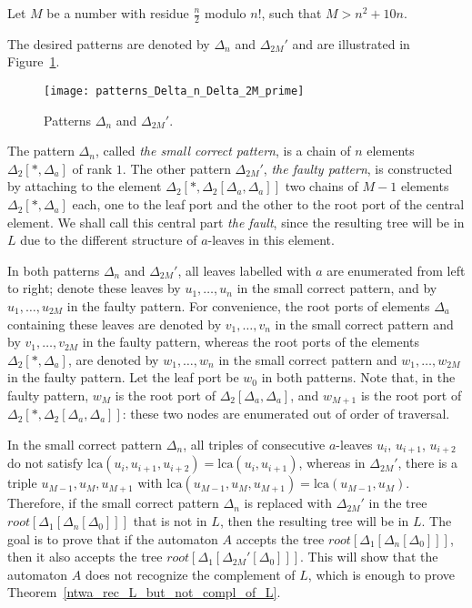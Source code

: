 \documentclass[12pt,a4paper]{article}
\theoremstyle{definition}
\begin{document}
Let $M$ be a number with residue $\frac{n}{2}$ modulo $n!$,
such that $M > n^2+10n$.

The desired patterns are denoted by $\Delta_{n}$ and $\Delta_{2M}'$
and are illustrated in Figure~\ref{f:patterns_Delta_n_Delta_2M_prime}.
\begin{figure}[t]
	\centerline{\texttt{[image: patterns\_Delta\_n\_Delta\_2M\_prime]}}
	\caption{Patterns $\Delta_n$ and $\Delta_{2M}'$.}
	\label{f:patterns_Delta_n_Delta_2M_prime}
\end{figure}
The pattern $\Delta_n$, called \emph{the small correct pattern},
is a chain of $n$ elements $\Delta_2[*,\Delta_a]$ of rank $1$.
The other pattern $\Delta_{2M}'$, \emph{the faulty pattern},
is constructed by attaching to the element $\Delta_2[*,\Delta_2[\Delta_a,\Delta_a]]$
two chains of $M-1$ elements $\Delta_2[*,\Delta_a]$ each,
one to the leaf port and the other to the root port of the central element.
We shall call this central part \emph{the fault},
since the resulting tree will be in $L$
due to the different structure of $a$-leaves in this element.

In both patterns $\Delta_n$ and $\Delta_{2M}'$,
all leaves labelled with $a$ are enumerated from left to right;
denote these leaves by $u_1, \ldots, u_n$ in the small correct pattern,
and by $u_1, \ldots, u_{2M}$ in the faulty pattern.
For convenience, the root ports of elements $\Delta_a$ containing these leaves
are denoted by $v_1, \ldots, v_n$ in the small correct pattern
and by $v_1, \ldots, v_{2M}$ in the faulty pattern,
whereas the root ports of the elements $\Delta_2[*,\Delta_a]$,
are denoted by $w_1,\ldots,w_n$ in the small correct pattern
and $w_1,\ldots,w_{2M}$ in the faulty pattern.
Let the leaf port be $w_0$ in both patterns.
Note that, in the faulty pattern, $w_M$ is the root port of $\Delta_2[\Delta_a,\Delta_a]$,
and $w_{M+1}$ is the root port of $\Delta_2[*,\Delta_2[\Delta_a,\Delta_a]]$:
these two nodes are enumerated out of order of traversal.

In the small correct pattern $\Delta_n$, all triples of consecutive $a$-leaves 
$u_i$, $u_{i+1}$, $u_{i+2}$
do not satisfy $\mathrm{lca}(u_i, u_{i+1},u_{i+2}) = \mathrm{lca}(u_i,u_{i+1})$,
whereas in $\Delta_{2M}'$, there is a triple $u_{M-1}, u_{M}, u_{M+1}$
with $\mathrm{lca}(u_{M-1},u_{M}, u_{M+1}) = \mathrm{lca}(u_{M-1},u_M)$.
Therefore, if the small correct pattern $\Delta_n$ is replaced with $\Delta_{2M}'$
in the tree $\mathit{root}[\Delta_1[\Delta_n[\Delta_0]]]$ that is not in $L$,
then the resulting tree will be in $L$.
The goal is to prove that if the automaton $A$
accepts the tree $\mathit{root}[\Delta_1[\Delta_n[\Delta_0]]]$,
then it also accepts the tree $\mathit{root}[\Delta_1[\Delta_{2M}'[\Delta_0]]]$.
This will show that the automaton $A$ does not recognize the complement of $L$,
which is enough to prove Theorem~\ref{ntwa_rec_L_but_not_compl_of_L}.
\end{document}
